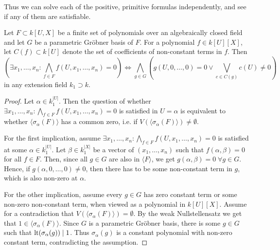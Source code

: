 Thus we can solve each of the positive, primitive formulas independently, and see if any of them are satisfiable.

\begin{theorem}
  Let $F \subset k[U, X]$ be a finite set of polynomials over an algebraically closed field and let $G$ be a parametric Gröbner basis of $F$. For a polynomial $f \in k[U][X]$, let $C(f) \subset k[U]$ denote the set of coefficients of non-constant terms in $f$. Then \[ \left(\exists x_{1}, \dots, x_{n} : \bigwedge_{f \in F} f(U, x_{1}, \dots, x_{n}) = 0 \right) \iff \bigwedge_{g \in G} \left( g(U, 0, \dots, 0) = 0 \lor \bigvee_{c \in C(g)} c(U) \neq 0 \right)\] in any extension field $k_{1} \supset k$.
\end{theorem}
\begin{proof}
  Let $\alpha \in k_{1}^{|U|}$. Then the question of whether $\exists x_{1}, \dots, x_{n} : \bigwedge_{f \in F} f(U, x_{1}, \dots, x_{n}) = 0$ is satisfied in $U = \alpha$ is equivalent to whether $\langle \sigma_{\alpha}(F) \rangle$ has a common zero, i.e. if $V(\langle \sigma_{\alpha}(F) \rangle) \neq \emptyset$.

  For the first implication, assume $\exists x_{1}, \dots, x_{n} : \bigwedge_{f \in F} f(U, x_{1}, \dots, x_{n}) = 0$ is satisfied at some $\alpha \in k_{1}^{|U|}$. Let $\beta \in k_{1}^{|X|}$ be a vector of $(x_{1}, \dots, x_{n})$ such that $f(\alpha, \beta) = 0$ for all $f \in F$. Then, since all $g \in G$ are also in $\langle F \rangle$, we get $g(\alpha, \beta) = 0 \; \forall g \in G$. Hence, if $g(\alpha, 0, \dots, 0) \neq 0$, then there has to be some non-constant term in $g$, which is also non-zero at $\alpha$.

  For the other implication, assume every $g \in G$ has zero constant term or some non-zero non-constant term, when viewed as a polynomial in $k[U][X]$. Assume for a contradiction that $V(\langle \sigma_{\alpha}(F) \rangle) = \emptyset$. By the weak Nullstellensatz we get that $1 \in \langle \sigma_{\alpha}(F) \rangle$. Since $G$ is a parametric Gröbner basis, there is some $g \in G$ such that $\operatorname{lt}(\sigma_{\alpha}(g)) \mid 1$. Thus $\sigma_{\alpha}(g)$ is a constant polynomial with non-zero constant term, contradicting the assumption.
\end{proof}



















